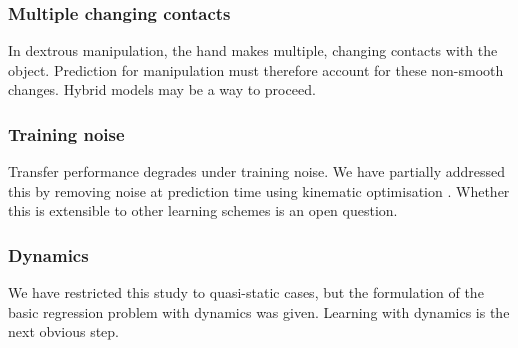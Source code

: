 \subsubsection{Multiple changing contacts}  In dextrous manipulation, the hand makes multiple, changing contacts with the object. Prediction for manipulation must therefore account for these non-smooth changes. Hybrid models may be a way to proceed.

\subsubsection{ Training noise} Transfer performance degrades under training noise. We have partially addressed this by removing noise at prediction time using kinematic optimisation \cite{belter2014iros}. Whether this is extensible to other learning schemes is an open question.

\subsubsection{Dynamics} We have restricted this study to quasi-static cases, but the formulation of the basic regression problem with dynamics was given. Learning with dynamics is the next obvious step.


